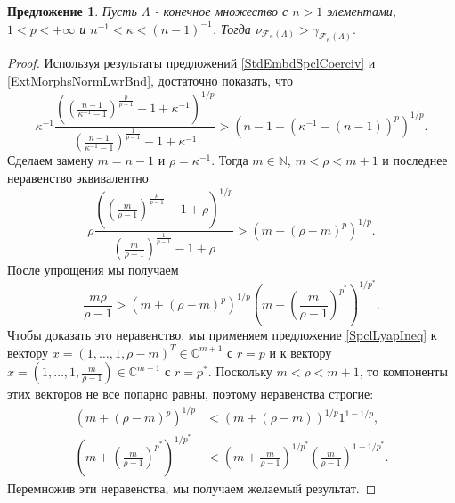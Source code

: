\documentclass[12pt]{article}
\newtheorem{proposition}[theorem]{Предложение}
\begin{document}
\begin{proposition}\label{CompStdEmbdCoercvAndExtMorphsNormInf}
    Пусть $\Lambda$ - конечное множество с $n>1$ элементами, $1<p<+\infty$ 
    и $n^{-1}<\kappa<(n-1)^{-1}$. Тогда
    $
    \nu_{\mathcal{F}_{\kappa}(\Lambda)}
    >
    \gamma_{\mathcal{F}_{\kappa}(\Lambda)}.
    $
\end{proposition}
\begin{proof}
    Используя результаты предложений \ref{StdEmbdSpclCoerciv} 
    и \ref{ExtMorphsNormLwrBnd}, достаточно показать, что
    \[
        \kappa^{-1}
        \frac{
            \left(
                \left(\frac{n-1}{\kappa^{-1}-1}
                \right)^{\frac{p}{p-1}}
                -1+\kappa^{-1}
            \right)^{1/p}
        }{
            \left(\frac{n-1}{\kappa^{-1}-1}
            \right)^{\frac{1}{p-1}}
            -1+\kappa^{-1}
        }
        >
        (n-1+(\kappa^{-1}-(n-1))^p)^{1/p}.
    \]
    Сделаем замену $m=n-1$ и $\rho=\kappa^{-1}$. 
    Тогда $m\in\mathbb{N}$, $m<\rho<m+1$ и последнее неравенство 
    эквивалентно
    \[
        \rho
        \frac{
            \left(
                \left(\frac{m}{\rho-1}
                \right)^{\frac{p}{p-1}}
                -1+\rho
            \right)^{1/p}
        }{
            \left(\frac{m}{\rho-1}
            \right)^{\frac{1}{p-1}}
            -1+\rho
        }
        >
        (m+(\rho-m)^p)^{1/p}.
    \] 
    После упрощения мы получаем 
    \[
        \frac{m\rho}{\rho-1}
        >
        (m+(\rho-m)^p)^{1/p}
        \left(
            m+\left(\frac{m}{\rho-1}\right)^{p^*}
        \right)^{1/p^*}.
    \]
    Чтобы доказать это неравенство, мы применяем предложение \ref{SpclLyapIneq} к 
    вектору $x=(1,\ldots,1,\rho-m)^T\in\mathbb{C}^{m+1}$ с $r=p$ и к вектору 
    $x=(1,\ldots,1,\frac{m}{\rho-1})\in\mathbb{C}^{m+1}$ с $r=p^*$. 
    Поскольку $m<\rho<m+1$, то компоненты этих векторов не все попарно равны,
    поэтому неравенства строгие:
    \[
    \begin{aligned}
        (m+(\rho-m)^p)^{1/p}
        &<
        (m+(\rho-m))^{1/p} 1^{1-1/p},\\
        \left(m+\left(\frac{m}{\rho-1}\right)^{p^*}\right)^{1/p^*}
        &<
        \left(m+\frac{m}{\rho-1}\right)^{1/p^*}
        \left(\frac{m}{\rho-1}\right)^{1-1/p^*}.
    \end{aligned}
    \]
    Перемножив эти неравенства, мы получаем желаемый результат.
\end{proof}
\end{document}
